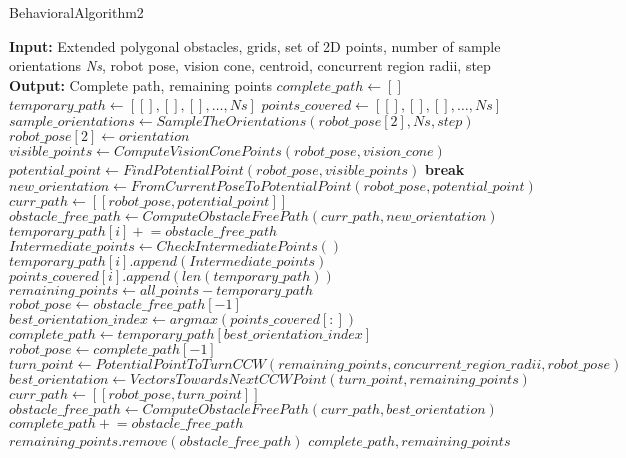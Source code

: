 \begin{algorithm}[H]
    \caption{BehavioralAlgorithm2}
    \begin{algorithmic}[1]
        \Statex \textbf{Input:} Extended polygonal obstacles, grids, set of 2D points, number of sample orientations \textit{Ns}, robot pose, vision cone, centroid, concurrent region radii, step
        \Statex \textbf{Output:} Complete path, remaining points
        \newline
        \State $complete\_path \gets []$
        \State $temporary\_path \gets [[], [], [], \ldots, Ns]$
        \State $points\_covered \gets [[], [], [], \ldots, Ns]$
        \State $sample\_orientations \gets SampleTheOrientations(robot\_pose[2], Ns, step)$
            \State $robot\_pose[2] \gets orientation$
                \State $visible\_points \gets ComputeVisionConePoints(robot\_pose, vision\_cone)$
                \State $potential\_point \gets FindPotentialPoint(robot\_pose, visible\_points)$
                    \State \textbf{break}
                \EndIf
                \State $new\_orientation \gets FromCurrentPoseToPotentialPoint(robot\_pose, potential\_point)$
                \State $curr\_path \gets [[robot\_pose, potential\_point]]$
                \State $obstacle\_free\_path \gets ComputeObstacleFreePath(curr\_path, new\_orientation)$
                \State $temporary\_path[i] \mathrel{+}= obstacle\_free\_path$
                \State $Intermediate\_points \gets CheckIntermediatePoints()$
                \State $temporary\_path[i].append(Intermediate\_points)$
                \State $points\_covered[i].append(len(temporary\_path))$
                \State $remaining\_points \gets all\_points - temporary\_path$
                \State $robot\_pose \gets obstacle\_free\_path[-1]$
            \EndWhile
        \EndFor
        \State $best\_orientation\_index \gets argmax(points\_covered[:])$
        \State $complete\_path \gets temporary\_path[best\_orientation\_index]$
        \State $robot\_pose \gets complete\_path[-1]$
        \State $turn\_point \gets PotentialPointToTurnCCW(remaining\_points, concurrent\_region\_radii, robot\_pose)$
        \State $best\_orientation \gets VectorsTowardsNextCCWPoint(turn\_point, remaining\_points)$
        \State $curr\_path \gets [[robot\_pose, turn\_point]]$
        \State $obstacle\_free\_path \gets ComputeObstacleFreePath(curr\_path, best\_orientation)$
        \State $complete\_path \mathrel{+}= obstacle\_free\_path$
        \State $remaining\_points.remove(obstacle\_free\_path)$
        \State \Return $complete\_path, remaining\_points$
    \end{algorithmic}
\end{algorithm}



